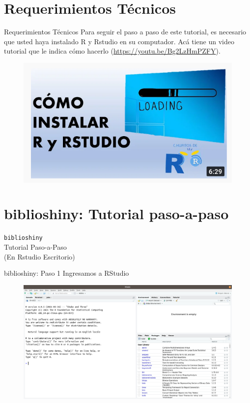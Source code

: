 \documentclass{beamer}
\begin{document}
\section{Requerimientos Técnicos}
\begin{frame}{Requerimientos Técnicos}
Para seguir el paso a paso de este tutorial, es necesario que usted haya instalado R y Rstudio en su computador. Acá tiene un video tutorial que le indica cómo hacerlo (\textcolor{blue}{\url{https://youtu.be/Bg2LzHmPZFY}}).
\begin{figure}
\centering
\includegraphics[width=.7\textwidth]{Chupitos.png}
\end{figure}      
\end{frame}

\section{biblioshiny: Tutorial paso-a-paso}
\begin{frame}
\Huge
\centering
\texttt{biblioshiny} \\
Tutorial Paso-a-Paso\\
(En Rstudio Escritorio)
\end{frame}


\begin{frame}{biblioshiny: Paso 1}
Ingresamos a RStudio 
\begin{figure}
\centering
\includegraphics[width=.95\textwidth]{Apariencia.png}
\end{figure}  
\end{frame}
\end{document}

